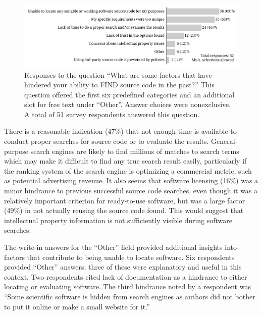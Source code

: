 \documentclass{casicswhitepaper}
\begin{document}
\begin{figure}[htb]
  \centering
  \includegraphics[width=6in]{files/plots/factors-that-hindered-finding-src.pdf}
  \vspace*{-4ex}
  \caption{Responses to the question ``What are some factors that have hindered your ability to FIND source code in the past?''  This question offered the first six predefined categories and an additional slot for free text under ``Other''.  Answer choices were nonexclusive.  A total of 51 survey respondents answered this question.}
  \label{factors-that-hindered}
\end{figure}

There is a reasonable indication (47\%) that not enough time is available to conduct proper searches for source code or to evaluate the results. General-purpose search engines are likely to find millions of matches to search terms which may make it difficult to find any true search result easily, particularly if the ranking system of the search engine is optimizing a commercial metric, such as potential advertising revenue. It also seems that software licensing (16\%) was a minor hindrance to previous successful source code searches, even though it was a relatively important criterion for ready-to-use software, but was a large factor (49\%) in not actually reusing the source code found. This would suggest that intellectual property information is not sufficiently visible during software searches.

%

The write-in answers for the ``Other'' field provided additional insights into factors that contribute to being unable to locate software.  Six respondents provided ``Other'' answers; three of these were explanatory and useful in this context.  Two respondents cited lack of documentation as a hindrance to either locating or evaluating software.  The third hindrance noted by a respondent was ``Some scientific software is hidden from search engines as authors did not bother to put it online or make a small website for it.''
\end{document}
